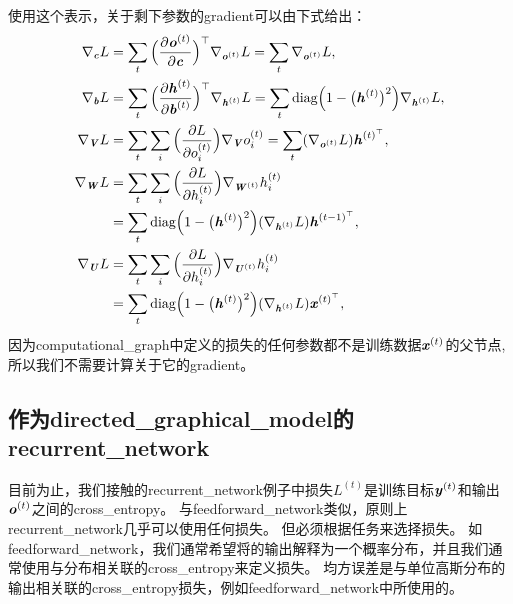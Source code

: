 使用这个表示，关于剩下参数的\gls{gradient}可以由下式给出：
\begin{align}
 \nabla_{\boldsymbol{\mathit{c}}} L &=  \sum_t \Big( \frac{\partial \boldsymbol{\mathit{o}}^{(t)}}{\partial \boldsymbol{\mathit{c}}} \Big)^\top \nabla_{\boldsymbol{\mathit{o}}^{(t)}} L 
 = \sum_t \nabla_{\boldsymbol{\mathit{o}}^{(t)}} L ,\\
 \nabla_{\boldsymbol{\mathit{b}}} L &= \sum_t \Big( \frac{\partial \boldsymbol{\mathit{h}}^{(t)}}{\partial \boldsymbol{\mathit{b}}^{(t)}} \Big)^\top \nabla_{\boldsymbol{\mathit{h}}^{(t)}} L 
 = \sum_t \text{diag} \Big( 1 - \big( \boldsymbol{\mathit{h}}^{(t)} \big)^2 \Big)  \nabla_{\boldsymbol{\mathit{h}}^{(t)}} L  ,\\
 \nabla_{\boldsymbol{\mathit{V}}} L &= \sum_t \sum_i \Big( \frac{\partial L} {\partial o_i^{(t)}}\Big) \nabla_{\boldsymbol{\mathit{V}}} o_i^{(t)} 
 = \sum_t (\nabla_{\boldsymbol{\mathit{o}}^{(t)}} L) \boldsymbol{\mathit{h}}^{(t)^\top},\\
 \nabla_{\boldsymbol{\mathit{W}}} L &= \sum_t \sum_i \Big( \frac{\partial L} {\partial h_i^{(t)}}\Big) 
 \nabla_{\boldsymbol{\mathit{W}}^{(t)}} h_i^{(t)} \\
&= \sum_t \text{diag} \Big( 1 - \big( \boldsymbol{\mathit{h}}^{(t)} \big)^2 \Big) ( \nabla_{\boldsymbol{\mathit{h}}^{(t)}} L) \boldsymbol{\mathit{h}}^{(t-1)^\top} ,\\
 \nabla_{\boldsymbol{\mathit{U}}} L &= \sum_t \sum_i \Big( \frac{\partial L} {\partial h_i^{(t)}}\Big) 
 \nabla_{\boldsymbol{\mathit{U}}^{(t)}} h_i^{(t)} \\
&= \sum_t \text{diag} \Big( 1 - \big( \boldsymbol{\mathit{h}}^{(t)} \big)^2 \Big) ( \nabla_{\boldsymbol{\mathit{h}}^{(t)}} L) \boldsymbol{\mathit{x}}^{(t)^\top} ,
\end{align}
因为\gls{computational_graph}中定义的损失的任何参数都不是训练数据$\boldsymbol{\mathit{x}}^{(t)}$的父节点,所以我们不需要计算关于它的\gls{gradient}。


\subsection{作为\gls{directed_graphical_model}的\gls{recurrent_network}}
\label{sec:recurrent_networks_as_directed_graphical_models}
目前为止，我们接触的\gls{recurrent_network}例子中损失$L^{(t)}$是训练目标$\boldsymbol{\mathit{y}}^{(t)}$和输出$\boldsymbol{\mathit{o}}^{(t)}$之间的\gls{cross_entropy}。
与\gls{feedforward_network}类似，原则上\gls{recurrent_network}几乎可以使用任何损失。
但必须根据任务来选择损失。
如\gls{feedforward_network}，我们通常希望将的输出解释为一个概率分布，并且我们通常使用与分布相关联的\gls{cross_entropy}来定义损失。
均方误差是与单位高斯分布的输出相关联的\gls{cross_entropy}损失，例如\gls{feedforward_network}中所使用的。

